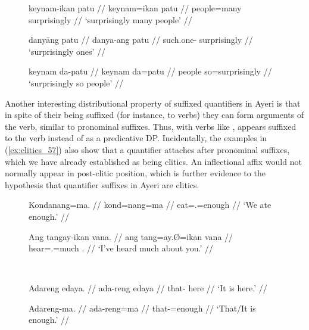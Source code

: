 \begin{figure}[h]
\pex\label{ex:patuquant_2}
\a\label{ex:patuquant_2_keynam}\begingl
	\gla keynam-ikan patu //
	\glb keynam=ikan patu //
	\glc people=many surprisingly //
	\glft `surprisingly many people' //
\endgl

\a\label{ex:patuquant_2_keynamikan}\ljudge*\begingl
	\gla danyāng patu //
	\glb danya-ang patu //
	\glc such.one-\Aarg{} surprisingly //
	\glft `surprisingly ones' //
\endgl

\a\label{ex:patuquant_2_ikan}\ljudge\ques\ques\begingl
	\gla keynam da-patu //
	\glb keynam da=patu //
	\glc people so=surprisingly //
	\glft `surprisingly so people' //
\endgl
\xe
\end{figure}

Another interesting distributional property of suffixed quantifiers in Ayeri is
that in spite of their being suffixed (for instance, to verbs) they can form
arguments of the verb, similar to pronominal suffixes. Thus, with verbs like
,  appears suffixed to the verb
instead of as a predicative DP. Incidentally, the examples in
(\ref{ex:clitics_57}) also show that a quantifier attaches after pronominal
suffixes, which we have already established as being clitics. An inflectional
affix would not normally appear in post-clitic position, which is further
evidence to the hypothesis that quantifier suffixes in Ayeri are clitics.

\begin{figure}
\begin{minipage}[t]{.55\remaining}
\pex\label{ex:clitics_57}
\a\label{ex:clitics_57a}\begingl
	\gla Kondanang=ma. //
	\glb kond=nang=ma //
	\glc eat=\Fpl{}.\Aarg{}=enough //
	\glft `We ate enough.' //
\endgl

\a\label{ex:clitics_57b}\begingl
	\gla Ang tangay-ikan vana. //
	\glb ang tang=ay.Ø=ikan vana //
	\glc \AgtT{} hear=\Fsg{}.\Top{}=much \Second{}.\Gen{} //
	\glft `I've heard much about you.' //
\endgl
\xe
\end{minipage}
~
\begin{minipage}[t]{.45\remaining}
\pex\label{ex:clitics_58}
\a\label{ex:clitics_58a}\begingl
	\gla Adareng edaya. //
	\glb ada-reng edaya //
	\glc that-\AargI{} here //
	\glft `It is here.' //
\endgl

\a\label{ex:clitics_58b}\begingl
	\gla Adareng-ma. //
	\glb ada-reng=ma //
	\glc that-\AargI{}=enough //
	\glft `That/It is enough.' //
\endgl
\xe
\end{minipage}
\end{figure}

